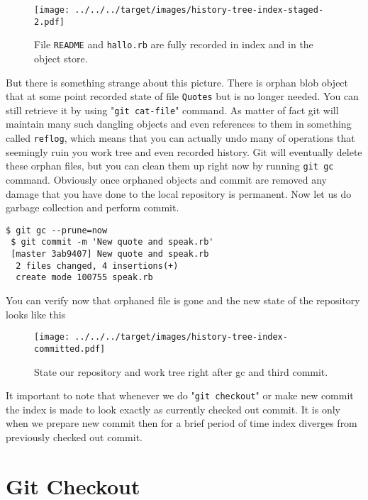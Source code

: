 \documentclass{article}
\theoremstyle{definition}
\begin{document}
        \begin{figure}[h]
            \centering\texttt{[image: ../../../target/images/history-tree-index-staged-2.pdf]}
            \caption{File \texttt{README} and \texttt{hallo.rb} are fully recorded in index and in the object store.\label{fig:history-tree-index-staged-2}}
        \end{figure}

        \noindent But there is something strange about this picture. There is orphan blob object that at some point
        recorded state of file \texttt{Quotes} but is no longer needed. You can still retrieve it by using
        "\texttt{git cat-file}" command. As matter of fact git will maintain many such dangling objects and even
        references to them in something called \texttt{reflog}, which means that you can actually undo many of
        operations that seemingly ruin you work tree and even recorded history. Git will eventually delete these orphan
        files, but you can clean them up right now by running \texttt{git gc} command. Obviously once orphaned objects
        and commit are removed any damage that you have done to the local repository is permanent. Now let us do garbage 
        collection and perform commit.

    \begin{Verbatim}[frame=single]
 $ git gc --prune=now
 $ git commit -m 'New quote and speak.rb'
 [master 3ab9407] New quote and speak.rb
  2 files changed, 4 insertions(+)
  create mode 100755 speak.rb
        \end{Verbatim}
        You can verify now that orphaned file is gone and the new state of the repository looks like this

        \begin{figure}[h]
        \texttt{[image: ../../../target/images/history-tree-index-committed.pdf]}
        \caption{State our repository and work tree right after gc and third commit.\label{fig:history-tree-index-committed}}
        \end{figure}

        It important to note that whenever we do "\texttt{git checkout}" or make new commit the index is made to look
        exactly as currently checked out commit. It is only when we prepare new commit then for a brief period of time
        index diverges from previously checked out commit.

        \section{Git Checkout}
\end{document}
